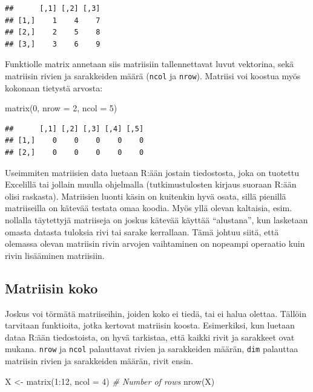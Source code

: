 \documentclass[
]{book}
\newenvironment{Shaded}{\begin{snugshade}}{\end{snugshade}}
\newcommand{\AttributeTok}[1]{\textcolor[rgb]{0.77,0.63,0.00}{#1}}
\newcommand{\CommentTok}[1]{\textcolor[rgb]{0.56,0.35,0.01}{\textit{#1}}}
\newcommand{\DecValTok}[1]{\textcolor[rgb]{0.00,0.00,0.81}{#1}}
\newcommand{\FunctionTok}[1]{\textcolor[rgb]{0.00,0.00,0.00}{#1}}
\newcommand{\NormalTok}[1]{#1}
\newcommand{\OtherTok}[1]{\textcolor[rgb]{0.56,0.35,0.01}{#1}}
\newcommand{\SpecialCharTok}[1]{\textcolor[rgb]{0.00,0.00,0.00}{#1}}
\begin{document}
\begin{verbatim}
##      [,1] [,2] [,3]
## [1,]    1    4    7
## [2,]    2    5    8
## [3,]    3    6    9
\end{verbatim}

Funktiolle matrix annetaan siis matriisiin tallennettavat luvut vektorina, sekä matriisin rivien ja sarakkeiden määrä (\texttt{ncol} ja \texttt{nrow}). Matriisi voi koostua myös kokonaan tietystä arvosta:

\begin{Shaded}
\begin{Highlighting}[]
\FunctionTok{matrix}\NormalTok{(}\DecValTok{0}\NormalTok{, }\AttributeTok{nrow =} \DecValTok{2}\NormalTok{, }\AttributeTok{ncol =} \DecValTok{5}\NormalTok{)}
\end{Highlighting}
\end{Shaded}

\begin{verbatim}
##      [,1] [,2] [,3] [,4] [,5]
## [1,]    0    0    0    0    0
## [2,]    0    0    0    0    0
\end{verbatim}

Useimmiten matriisien data luetaan R:ään jostain tiedostosta, joka on tuotettu Excelillä tai jollain muulla ohjelmalla (tutkimustulosten kirjaus suoraan R:ään olisi raskasta). Matriisien luonti käsin on kuitenkin hyvä osata, sillä pienillä matriiseilla on kätevää testata omaa koodia. Myös yllä olevan kaltaisia, esim. nollalla täytettyjä matriiseja on joskus kätevää käyttää ``alustana'', kun lasketaan omasta datasta tuloksia rivi tai sarake kerrallaan. Tämä johtuu siitä, että olemassa olevan matriisin rivin arvojen vaihtaminen on nopeampi operaatio kuin rivin lisääminen matriisiin.

\hypertarget{matriisin-koko}{%
\subsection{Matriisin koko}\label{matriisin-koko}}

Joskus voi törmätä matriiseihin, joiden koko ei tiedä, tai ei halua olettaa. Tällöin tarvitaan funktioita, jotka kertovat matriisin koosta. Esimerkiksi, kun luetaan dataa R:ään tiedostoista, on hyvä tarkistaa, että kaikki rivit ja sarakkeet ovat mukana. \texttt{nrow} ja \texttt{ncol} palauttavat rivien ja sarakkeiden määrän, \texttt{dim} palauttaa matriisin rivien ja sarakkeiden määrän, rivit ensin.

\begin{Shaded}
\begin{Highlighting}[]
\NormalTok{X }\OtherTok{\textless{}{-}} \FunctionTok{matrix}\NormalTok{(}\DecValTok{1}\SpecialCharTok{:}\DecValTok{12}\NormalTok{, }\AttributeTok{ncol =} \DecValTok{4}\NormalTok{)}
\CommentTok{\# Number of rows}
\FunctionTok{nrow}\NormalTok{(X)}
\end{Highlighting}
\end{Shaded}
\end{document}
